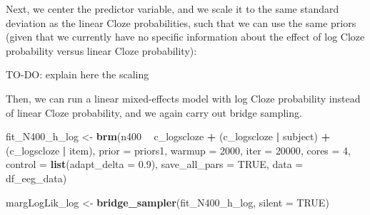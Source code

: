 \documentclass[12pt,]{krantz}
\newenvironment{Shaded}{\begin{snugshade}}{\end{snugshade}}
\newcommand{\KeywordTok}[1]{\textcolor[rgb]{0.13,0.29,0.53}{\textbf{#1}}}
\newcommand{\DataTypeTok}[1]{\textcolor[rgb]{0.13,0.29,0.53}{#1}}
\newcommand{\DecValTok}[1]{\textcolor[rgb]{0.00,0.00,0.81}{#1}}
\newcommand{\FloatTok}[1]{\textcolor[rgb]{0.00,0.00,0.81}{#1}}
\newcommand{\StringTok}[1]{\textcolor[rgb]{0.31,0.60,0.02}{#1}}
\newcommand{\OtherTok}[1]{\textcolor[rgb]{0.56,0.35,0.01}{#1}}
\newcommand{\OperatorTok}[1]{\textcolor[rgb]{0.81,0.36,0.00}{\textbf{#1}}}
\newcommand{\NormalTok}[1]{#1}
\theoremstyle{definition}
\theoremstyle{definition}
\theoremstyle{definition}
\theoremstyle{remark}
\begin{document}
Next, we center the predictor variable, and we scale it to the same
standard deviation as the linear Cloze probabilities, such that we can
use the same priors (given that we currently have no specific
information about the effect of log Cloze probability versus linear
Cloze probability):

TO-DO: explain here the scaling

\begin{Shaded}
\end{Shaded}

Then, we can run a linear mixed-effects model with log Cloze probability
instead of linear Cloze probability, and we again carry out bridge
sampling.

\begin{Shaded}
\begin{Highlighting}[]
\NormalTok{fit_N400_h_log <-}\StringTok{ }\KeywordTok{brm}\NormalTok{(n400 }\OperatorTok{~}\StringTok{ }\NormalTok{c_logscloze }\OperatorTok{+}\StringTok{ }
\StringTok{                        }\NormalTok{(c_logscloze }\OperatorTok{|}\StringTok{ }\NormalTok{subject) }\OperatorTok{+}\StringTok{ }\NormalTok{(c_logscloze }\OperatorTok{|}\StringTok{ }\NormalTok{item), }
                      \DataTypeTok{prior   =}\NormalTok{ priors1,}
                      \DataTypeTok{warmup  =} \DecValTok{2000}\NormalTok{,}
                      \DataTypeTok{iter    =} \DecValTok{20000}\NormalTok{,}
                      \DataTypeTok{cores   =} \DecValTok{4}\NormalTok{,}
                      \DataTypeTok{control =} \KeywordTok{list}\NormalTok{(}\DataTypeTok{adapt_delta =} \FloatTok{0.9}\NormalTok{),}
                      \DataTypeTok{save_all_pars =} \OtherTok{TRUE}\NormalTok{,}
                      \DataTypeTok{data    =}\NormalTok{ df_eeg_data)}
\end{Highlighting}
\end{Shaded}

\begin{Shaded}
\begin{Highlighting}[]
\NormalTok{margLogLik_log <-}\StringTok{ }\KeywordTok{bridge_sampler}\NormalTok{(fit_N400_h_log, }\DataTypeTok{silent =} \OtherTok{TRUE}\NormalTok{)}
\end{Highlighting}
\end{Shaded}
\end{document}
